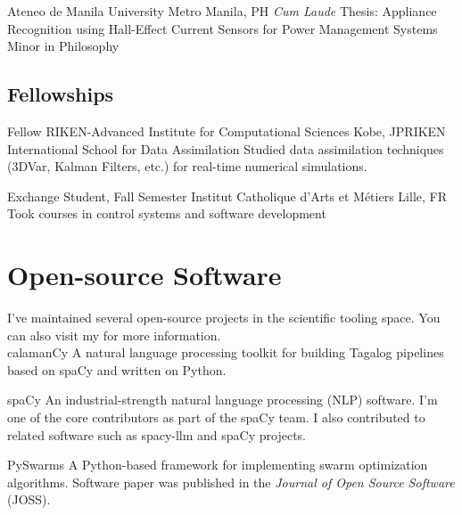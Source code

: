 \documentclass[12pt,a4paper]{moderncv}
\begin{document}
{Ateneo de Manila University}
{Metro Manila, PH}
{\textit{Cum Laude}}
{
    Thesis: Appliance Recognition using Hall-Effect Current Sensors for
    Power Management Systems\\
    Minor in Philosophy
}
\vspace{0.5em}


\subsection{Fellowships}

{Fellow}
{RIKEN-Advanced Institute for Computational Sciences}
{Kobe, JP}{RIKEN International School for Data Assimilation}
{Studied data assimilation techniques (3DVar, Kalman Filters, etc.) for real-time numerical simulations.}
\vspace{0.5em}

{Exchange Student, Fall Semester}
{Institut Catholique d'Arts et M\'etiers}
{Lille, FR}{}
{Took courses in control systems and software development}

\section{Open-source Software}

I've maintained several open-source projects in the scientific tooling space. 
You can also visit my {\color{blue}} for more information.\\


{\color{blue}
    }
{calamanCy}{}{}
{
    A natural language processing toolkit for building Tagalog pipelines based on spaCy and written on Python.
}

{\color{blue}
    }
{spaCy}{}{}
{
    An industrial-strength natural language processing (NLP) software. 
    I'm one of the core contributors as part of the spaCy team.
    I also contributed to related software such as spacy-llm and spaCy projects.
}

{\color{blue} }
{PySwarms}{}{}
{
    A Python-based framework for implementing swarm optimization
    algorithms. Software paper was published in the \textit{Journal of Open
        Source Software} (JOSS).
}
\end{document}
